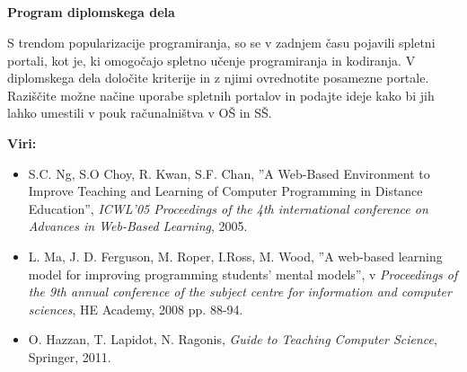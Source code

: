 \begin{center}
\section*{\podnaslov}
\textbf{Program diplomskega dela}
\end{center}

S trendom popularizacije programiranja, so se v zadnjem času pojavili spletni
portali, kot je, ki omogočajo spletno učenje programiranja in kodiranja. V
diplomskega dela določite kriterije in z njimi ovrednotite posamezne portale.
Raziščite možne načine uporabe spletnih portalov in podajte ideje kako bi jih
lahko umestili v pouk računalništva v OŠ in SŠ.

\textbf{Viri:}
\begin{itemize}
\item S.C. Ng, S.O Choy, R. Kwan, S.F. Chan, ''A Web-Based Environment to
  Improve Teaching and Learning of Computer Programming in Distance Education'',
  \emph{ICWL'05 Proceedings of the 4th international conference on Advances in
    Web-Based Learning}, 2005.
\item L. Ma, J. D. Ferguson, M. Roper, I.Ross, M. Wood, ''A web-based learning
  model for improving programming students' mental models'', v \emph{Proceedings
    of the 9th annual conference of the subject centre for information and
    computer sciences}, HE Academy, 2008 pp. 88-94.
\item  O. Hazzan, T. Lapidot, N. Ragonis, \emph{Guide to Teaching Computer
    Science}, Springer, 2011.
\end{itemize}

\vspace{2cm}
\begin{flushright}
\mentor
\end{flushright}



